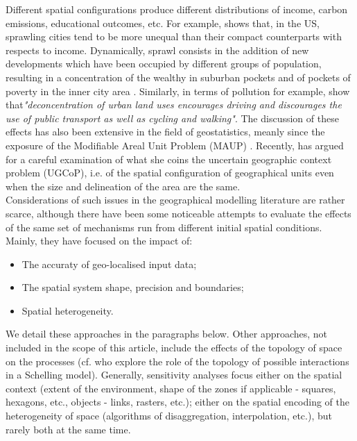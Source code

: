 \documentclass[Afour,sageh,times]{sagej}
\begin{document}
Different spatial configurations produce different distributions of income, carbon emissions, educational outcomes, etc. For example, \citet{wheeler2006urban} shows that, in the US, sprawling cities tend to be more unequal than their compact counterparts with respects to income. Dynamically, sprawl consists in the addition of new developments which have been occupied by different groups of population, resulting in a concentration of the wealthy in suburban pockets and of pockets of poverty in the inner city area \citep{jargowsky2002sprawl}. Similarly, in terms of pollution for example, \citet[p.173]{schwanen2001travel} show that{\it "deconcentration of urban land uses encourages driving and discourages the use of public transport as well as cycling and walking"}. The discussion of these effects has also been extensive in the field of geostatistics, meanly since the exposure of the Modifiable Areal Unit Problem (MAUP) \citep{Openshaw1984, FotheringhamWong1991}. Recently, \citet{Kwan2012} has argued for a careful examination of what she coins the uncertain geographic context problem (UGCoP), i.e. of the spatial configuration of geographical units even when the size and delineation of the area are the same.\\

Considerations of such issues in the geographical modelling literature are rather scarce, although there have been some noticeable attempts to evaluate the effects of the same set of mechanisms run from different initial spatial conditions. Mainly, they have focused on the impact of:
\begin{itemize}
\item The accuraty of geo-localised input data;
\item The spatial system shape, precision and boundaries;
\item Spatial heterogeneity.
\end{itemize}
We detail these approaches in the paragraphs below. Other approaches, not included in the scope of this article, include the effects of the topology of space on the processes (cf. \citet{moreno2009integrating} who explore the role of the topology of possible interactions in a Schelling model). Generally, sensitivity analyses focus either on the spatial context (extent of the environment, shape of the zones if applicable - squares, hexagons, etc., objects - links, rasters, etc.); either on the spatial encoding of the heterogeneity of space (algorithms of disaggregation, interpolation, etc.), but rarely both at the same time.
\end{document}
